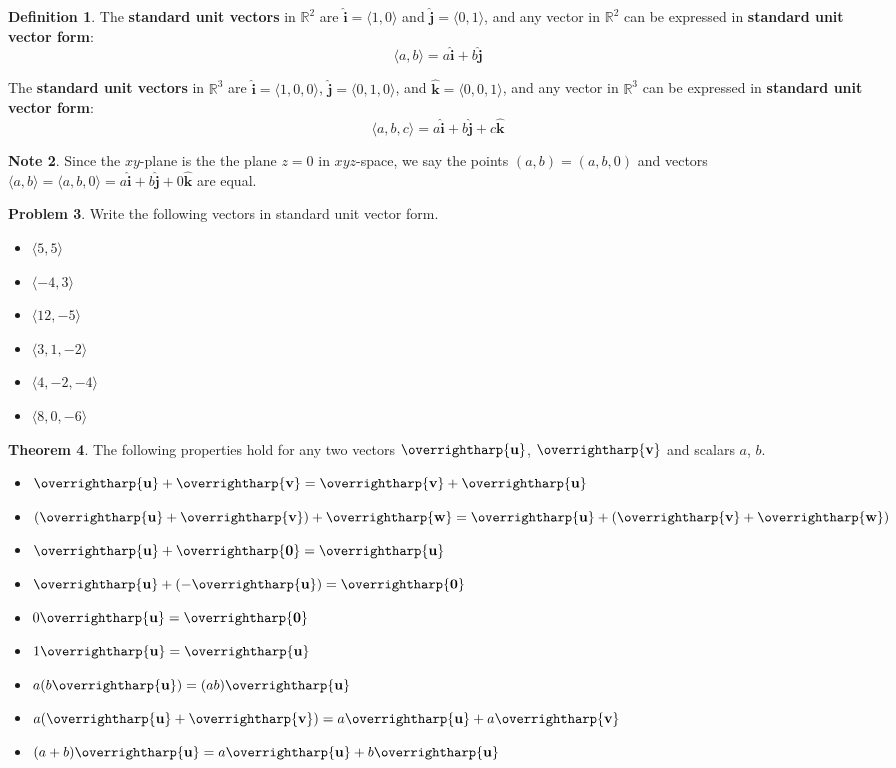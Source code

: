 \documentclass[letterpaper, twoside, 12pt]{book}
\newcommand{\<}{\langle}
\renewcommand{\>}{\rangle}
\theoremstyle{definition}
\newtheorem{theorem}{Theorem}
\theoremstyle{definition}
\newtheorem{definition}[theorem]{Definition}
\newtheorem{problem}[theorem]{Problem}
\newtheorem{note}[theorem]{Note}
\newcommand{\harpvec}[1]{\overrightharp{\ensuremath{\mathbf{#1}}}}
\newcommand{\veci}{\ensuremath{\mathbf{\widehat{i}}}}
\newcommand{\vecj}{\ensuremath{\mathbf{\widehat{j}}}}
\newcommand{\veck}{\ensuremath{\mathbf{\widehat{k}}}}
\begin{document}
\vfill

\begin{definition}
The \textbf{standard unit vectors} in $\mathbb{R}^2$ are
$\veci=\<1,0\>$ and $\vecj=\<0,1\>$, and any vector in $\mathbb{R}^2$
can be expressed in \textbf{standard unit vector form}:
  \[\<a,b\>=a\veci+b\vecj\]

The \textbf{standard unit vectors} in $\mathbb{R}^3$ are
$\veci=\<1,0,0\>$, $\vecj=\<0,1,0\>$, and $\veck=\<0,0,1\>$, and any vector in
$\mathbb{R}^3$ can be expressed in \textbf{standard unit vector form}:
  \[\<a,b,c\>=a\veci+b\vecj+c\veck\]
\end{definition}

\begin{note}
  Since the $xy$-plane is the the plane $z=0$ in $xyz$-space, we say the
  points $(a,b)=(a,b,0)$ and vectors $\<a,b\>=\<a,b,0\>=a\veci+b\vecj+0\veck$
  are equal.
\end{note}

\newpage

\begin{problem}
  Write the following vectors in standard unit vector form.
  \begin{itemize}
    \item $\<5,5\>$
    \item $\<-4,3\>$
    \item $\<12,-5\>$
    \item $\<3,1,-2\>$
    \item $\<4,-2,-4\>$
    \item $\<8,0,-6\>$
  \end{itemize}
\end{problem}

\vfill

\begin{theorem}
The following properties hold for any two vectors $\harpvec{u}$, $\harpvec{v}$
and scalars $a$, $b$.
  \begin{itemize}
  \item $\harpvec{u}+\harpvec{v} = \harpvec{v}+\harpvec{u}$
  \item $(\harpvec{u}+\harpvec{v})+\harpvec{w} = \harpvec{u}+(\harpvec{v}+\harpvec{w})$
  \item $\harpvec{u}+\harpvec{0} = \harpvec{u}$
  \item $\harpvec{u}+(-\harpvec{u}) = \harpvec{0}$
  \item $0\harpvec{u} = \harpvec{0}$
  \item $1\harpvec{u} = \harpvec{u}$
  \item $a(b\harpvec{u}) = (ab)\harpvec{u}$
  \item $a(\harpvec{u} + \harpvec{v}) = a\harpvec{u} + a\harpvec{v}$
  \item $(a+b)\harpvec{u} = a\harpvec{u} + b\harpvec{u}$
  \end{itemize}
\end{theorem}
\end{document}

